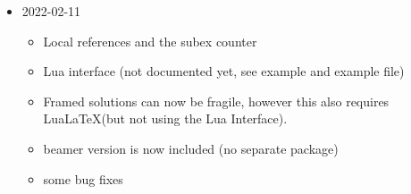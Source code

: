 \documentclass[DIV12,BCOR0mm]{scrartcl}
\newcommand{\optionstyle}{\normalfont\ttfamily\color{red!50!black}}
\newcommand{\option}[1]{{\optionstyle #1}}
\newcommand{\vers}[1]{{\normalfont\ttfamily\color{black!90} #1}}
\newcommand{\versitem}[1][]{\item[v. \vers{#1}]}
\begin{document}
\begin{itemize}
\begin{itemize}
        \item new option \option{beamerwithfootline}
      \end{itemize}
  \versitem[0.11:]  2022-02-11
      \begin{itemize}
        \item Local references and the subex counter
        \item Lua interface (not documented yet, see example and example file)
        \item Framed solutions can now be fragile, however this
        also requires Lua\LaTeX (but not using the Lua Interface).
        \item beamer version is now included (no separate package)
        \item some bug fixes
      \end{itemize}
\end{itemize}
\end{document}
